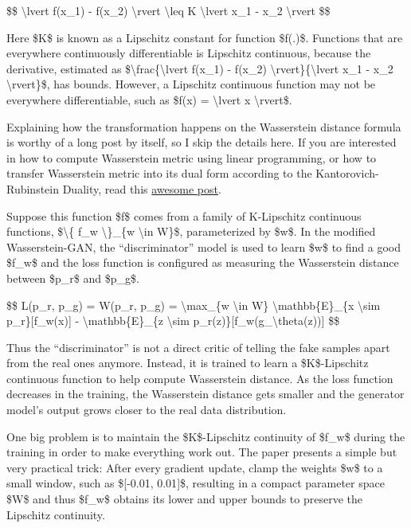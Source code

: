 \$\$ \textbackslash lvert f(x\_1) - f(x\_2) \textbackslash rvert \textbackslash leq K \textbackslash lvert x\_1 - x\_2 \textbackslash rvert \$\$

Here \$K\$ is known as a Lipschitz constant for function \$f(.)\$. Functions that are everywhere continuously differentiable is Lipschitz continuous, because the derivative, estimated as \$\textbackslash frac\{\textbackslash lvert f(x\_1) - f(x\_2) \textbackslash rvert\}\{\textbackslash lvert x\_1 - x\_2 \textbackslash rvert\}\$, has bounds. However, a Lipschitz continuous function may not be everywhere differentiable, such as \$f(x) = \textbackslash lvert x \textbackslash rvert\$.

Explaining how the transformation happens on the Wasserstein distance formula is worthy of a long post by itself, so I skip the details here. If you are interested in how to compute Wasserstein metric using linear programming, or how to transfer Wasserstein metric into its dual form according to the Kantorovich-Rubinstein Duality, read this \href{https://vincentherrmann.github.io/blog/wasserstein/}{awesome post}.

Suppose this function \$f\$ comes from a family of K-Lipschitz continuous functions, \$\textbackslash\{ f\_w \textbackslash\}\_\{w \textbackslash in W\}\$, parameterized by \$w\$. In the modified Wasserstein-GAN, the ``discriminator'' model is used to learn \$w\$ to find a good \$f\_w\$ and the loss function is configured as measuring the Wasserstein distance between \$p\_r\$ and \$p\_g\$.

\$\$ L(p\_r, p\_g) = W(p\_r, p\_g) = \textbackslash max\_\{w \textbackslash in W\} \textbackslash mathbb\{E\}\_\{x \textbackslash sim p\_r\}{[}f\_w(x){]} - \textbackslash mathbb\{E\}\_\{z \textbackslash sim p\_r(z)\}{[}f\_w(g\_\textbackslash theta(z)){]} \$\$

Thus the ``discriminator'' is not a direct critic of telling the fake samples apart from the real ones anymore. Instead, it is trained to learn a \$K\$-Lipschitz continuous function to help compute Wasserstein distance. As the loss function decreases in the training, the Wasserstein distance gets smaller and the generator model's output grows closer to the real data distribution.

One big problem is to maintain the \$K\$-Lipschitz continuity of \$f\_w\$ during the training in order to make everything work out. The paper presents a simple but very practical trick: After every gradient update, clamp the weights \$w\$ to a small window, such as \${[}-0.01, 0.01{]}\$, resulting in a compact parameter space \$W\$ and thus \$f\_w\$ obtains its lower and upper bounds to preserve the Lipschitz continuity.

